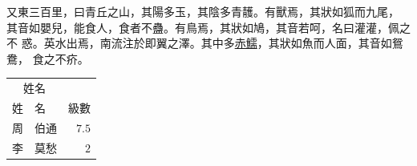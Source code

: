 \documentclass[10pt]{article} %
\begin{document}
\begin{minipage}[t]{.30\linewidth}
\begin{mdframed}[style=sidebar,frametitle={}]
又東三百里，曰青丘之山，其陽多玉，其陰多青䨼。有獸焉，其狀如狐而九尾，
其音如嬰兒，能食人，食者不蠱。有鳥焉，其狀如鳩，其音若呵，名曰灌灌，佩之不
惑。英水出焉，南流注於即翼之澤。其中多\href{http://www.example.com}{赤鱬}，其狀如魚而人面，其音如鴛鴦，
食之不疥。

\begin{center}
\begin{tabular}{llr}
\toprule
\multicolumn{2}{c}{姓名} \\
\cmidrule(r){1-2}
姓 & 名 & 級數 \\
\midrule
周 & 伯通 & $7.5$ \\
李 & 莫愁 & $2$ \\
\bottomrule
\end{tabular}
\end{center}

\end{mdframed}
\end{minipage}\hfill %
%
%
\end{document}

